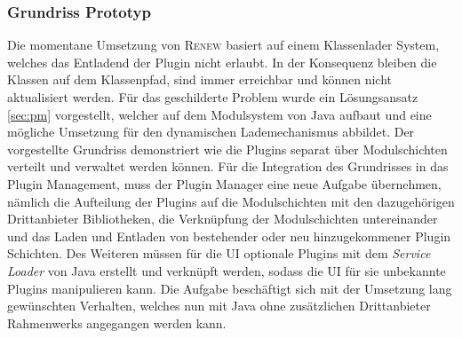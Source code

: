  \subsubsection{Grundriss Prototyp}
	Die momentane Umsetzung von \textsc{Renew} basiert auf einem Klassenlader System, welches das Entladend der Plugin nicht erlaubt. In der Konsequenz bleiben die Klassen auf dem Klassenpfad, sind immer erreichbar und können nicht aktualisiert werden. Für das geschilderte Problem wurde ein Lösungsansatz \ref{sec:pm} vorgestellt, welcher auf dem Modulsystem von Java aufbaut und eine mögliche Umsetzung für den dynamischen Lademechanismus abbildet. Der vorgestellte Grundriss demonstriert wie die Plugins separat über Modulschichten verteilt und verwaltet werden können.\newline
	Für die Integration des Grundrisses in das Plugin Management, muss der Plugin Manager eine neue Aufgabe übernehmen, nämlich die Aufteilung der Plugins auf die Modulschichten mit den dazugehörigen Drittanbieter Bibliotheken, die Verknüpfung der Modulschichten untereinander und das Laden und Entladen von bestehender oder neu hinzugekommener Plugin Schichten. Des Weiteren müssen für die UI optionale Plugins mit dem \textit{Service Loader} von Java erstellt und verknüpft werden, sodass die UI für sie unbekannte Plugins manipulieren kann. \newline
	Die Aufgabe beschäftigt sich mit der Umsetzung lang gewünschten Verhalten, welches nun mit Java ohne zusätzlichen Drittanbieter Rahmenwerks angegangen werden kann. 





